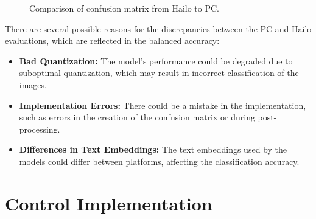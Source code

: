 \begin{figure}[!h]
    \centering
    \label{methods:fig:compareConfM}
    \caption{Comparison of confusion matrix from Hailo to PC.}
\end{figure}

There are several possible reasons for the discrepancies between the PC and Hailo evaluations, which are reflected in the balanced accuracy:
\begin{itemize}
    \item \textbf{Bad Quantization:} The model's performance could be degraded due to suboptimal quantization, which may result in incorrect classification of the images.
    \item \textbf{Implementation Errors:} There could be a mistake in the implementation, such as errors in the creation of the confusion matrix or during post-processing.
    \item \textbf{Differences in Text Embeddings:} The text embeddings used by the models could differ between platforms, affecting the classification accuracy.
\end{itemize}

\section{Control Implementation
    \label{scetion:methods:contimp}}


